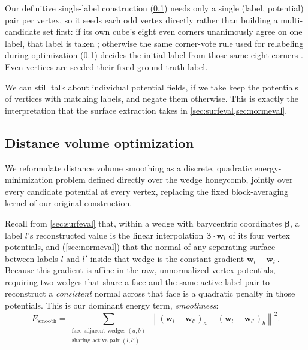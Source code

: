 \documentclass[journal]{vgtc}                     %
\begin{document}
Our definitive single-label construction (\cref{sec:smoothing}) needs only a single (label, potential) pair per vertex, so it seeds each odd vertex directly rather than building a multi-candidate set first: if its own cube's eight even corners unanimously agree on one label, that label is taken
; otherwise the same corner-vote rule used for relabeling during optimization (\cref{sec:smoothing}) decides the initial label from those same eight corners
. Even vertices are seeded their fixed ground-truth label.

We can still talk about individual potential fields, if we take keep the potentials of vertices with matching labels, and negate them otherwise. This is exactly the interpretation that the surface extraction takes in \cref{sec:surfeval,sec:normeval}.

\subsection{Distance volume optimization} \label{sec:smoothing}

We reformulate distance volume smoothing as a discrete, quadratic energy-minimization problem defined directly over the wedge honeycomb, jointly over every candidate potential at every vertex, replacing the fixed block-averaging kernel of our original construction.

Recall from \cref{sec:surfeval} that, within a wedge with barycentric coordinates $\mathbf{\beta}$, a label $l$'s reconstructed value is the linear interpolation $\mathbf{\beta} \cdot \mathbf{w}_l$ of its four vertex potentials, and (\cref{sec:normeval}) that the normal of any separating surface between labels $l$ and $l'$ inside that wedge is the constant gradient $\mathbf{w}_l - \mathbf{w}_{l'}$. Because this gradient is affine in the raw, unnormalized vertex potentials, requiring two wedges that share a face and the same active label pair to reconstruct a \emph{consistent} normal across that face is a quadratic penalty in those potentials. This is our dominant energy term, \emph{smoothness}:
\begin{equation} \label{eq:smoothness}
	E_{\mathrm{smooth}} = \!\!\!\sum_{\substack{\text{face-adjacent wedges } (a,b) \\ \text{sharing active pair } (l,l')}}\!\!\! \left\| (\mathbf{w}_l - \mathbf{w}_{l'})_a - (\mathbf{w}_l - \mathbf{w}_{l'})_b \right\|^2 .
\end{equation}
\end{document}
